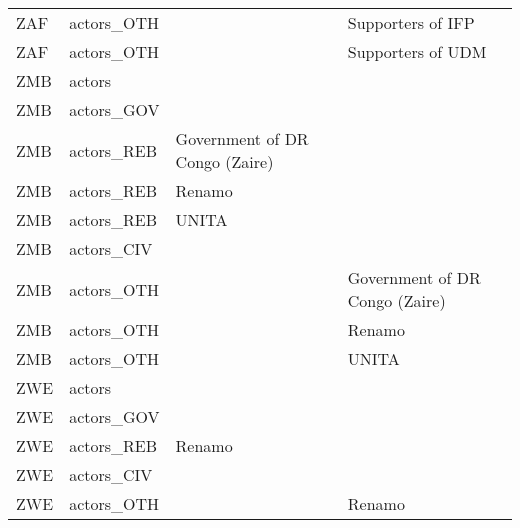 \begin{table}[ht]
\begin{tabular}{llll}
  ZAF & actors\_OTH &  & Supporters of IFP \\ 
  ZAF & actors\_OTH &  & Supporters of UDM \\ 
  ZMB & actors &  &  \\ 
  ZMB & actors\_GOV &  &  \\ 
  ZMB & actors\_REB & Government of DR Congo (Zaire) &  \\ 
  ZMB & actors\_REB & Renamo &  \\ 
  ZMB & actors\_REB & UNITA &  \\ 
  ZMB & actors\_CIV &  &  \\ 
  ZMB & actors\_OTH &  & Government of DR Congo (Zaire) \\ 
  ZMB & actors\_OTH &  & Renamo \\ 
  ZMB & actors\_OTH &  & UNITA \\ 
  ZWE & actors &  &  \\ 
  ZWE & actors\_GOV &  &  \\ 
  ZWE & actors\_REB & Renamo &  \\ 
  ZWE & actors\_CIV &  &  \\ 
  ZWE & actors\_OTH &  & Renamo \\ 
   \hline
\end{tabular}
\end{table}
